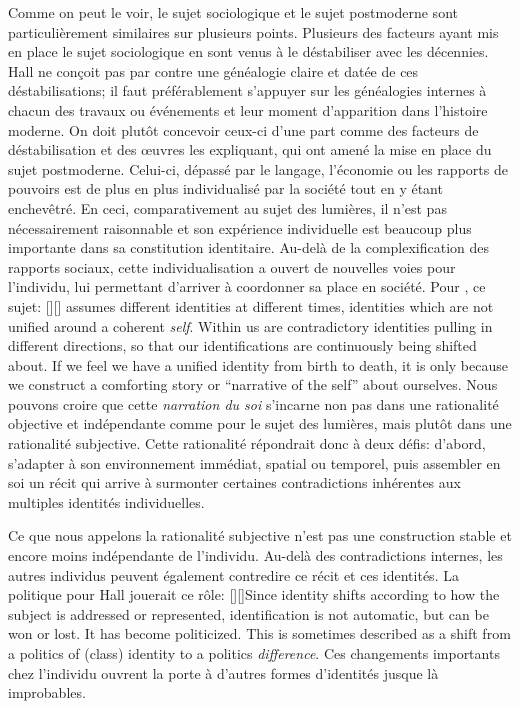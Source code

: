 Comme on peut le voir, le sujet sociologique et le sujet postmoderne sont particulièrement similaires sur plusieurs points.
Plusieurs des facteurs ayant mis en place le sujet sociologique en sont venus à le déstabiliser avec les décennies.
Hall ne conçoit pas par contre une généalogie claire et datée de ces déstabilisations; il faut préférablement s'appuyer sur les généalogies internes à chacun des travaux ou événements et leur moment d'apparition dans l'histoire moderne.
On doit plutôt concevoir ceux-ci d'une part comme des facteurs de déstabilisation et des œuvres les expliquant, qui ont amené la mise en place du sujet postmoderne.
Celui-ci, dépassé par le langage, l'économie ou les rapports de pouvoirs est de plus en plus individualisé par la société tout en y étant enchevêtré.
En ceci, comparativement au sujet des lumières, il n'est pas nécessairement raisonnable et son expérience individuelle est beaucoup plus importante dans sa constitution identitaire.
Au-delà de la complexification des rapports sociaux, cette individualisation a ouvert de nouvelles voies pour l'individu, lui permettant d'arriver à coordonner sa place en société.
Pour \citeauthor{Hall1996a}, ce sujet: [{\citeyear[598]{Hall1996a}}][]{\textelp{} assumes different identities at different times, identities which are not unified around a coherent \emph{self}. Within us are contradictory identities pulling in different directions, so that our identifications are continuously being shifted about. If we feel we have a unified identity from birth to death, it is only because we construct a comforting story or ``narrative of the self'' about ourselves}.
Nous pouvons croire que cette \emph{narration du soi} s'incarne non pas dans une rationalité objective et indépendante comme pour le sujet des lumières, mais plutôt dans une rationalité subjective.
Cette rationalité répondrait donc à deux défis: d'abord, s'adapter à son environnement immédiat, spatial ou temporel, puis assembler en soi un récit qui arrive à surmonter certaines contradictions inhérentes aux multiples identités individuelles.

Ce que nous appelons la rationalité subjective n'est pas une construction stable et encore moins indépendante de l'individu.
Au-delà des contradictions internes, les autres individus peuvent également contredire ce récit et ces identités.
La politique pour Hall jouerait ce rôle: [{\citeyear[610]{Hall1996a}}][]{Since identity shifts according to how the subject is addressed or represented, identification is not automatic, but can be won or lost. It has become politicized. This is sometimes described as a shift from a politics of (class) identity to a politics \emph{difference}}.
Ces changements importants chez l'individu ouvrent la porte à d'autres formes d'identités jusque là improbables.

